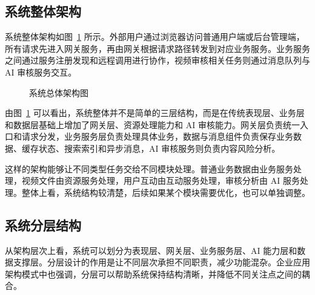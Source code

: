 \subsection{系统整体架构}
\label{subsec:system-architecture}

系统整体架构如图~\ref{fig:system-architecture} 所示。外部用户通过浏览器访问普通用户端或后台管理端，所有请求先进入网关服务，再由网关根据请求路径转发到对应业务服务。业务服务之间通过服务注册发现和远程调用进行协作，视频审核相关任务则通过消息队列与 AI 审核服务交互。

\begin{figure}[htbp]
  \centering
  \caption{系统总体架构图}
  \label{fig:system-architecture}
\end{figure}

由图~\ref{fig:system-architecture} 可以看出，系统整体并不是简单的三层结构，而是在传统表现层、业务层和数据层基础上增加了网关层、资源处理能力和 AI 审核能力。网关层负责统一入口和请求分发，业务服务层负责处理具体业务，数据与消息组件负责保存业务数据、缓存状态、搜索索引和异步消息，AI 审核服务则负责内容风险分析。

这样的架构能够让不同类型任务交给不同模块处理。普通业务数据由业务服务处理，视频文件由资源服务处理，用户互动由互动服务处理，审核分析由 AI 服务处理。整体上看，系统结构较清楚，后续如果某个模块需要优化，也可以单独调整。

\subsection{系统分层结构}
\label{subsec:system-layer-structure}

从架构层次上看，系统可以划分为表现层、网关层、业务服务层、AI 能力层和数据支撑层。分层设计的作用是让不同层次承担不同职责，减少功能混杂。企业应用架构模式中也强调，分层可以帮助系统保持结构清晰，并降低不同关注点之间的耦合\cite{fowler2002poeaa}。

